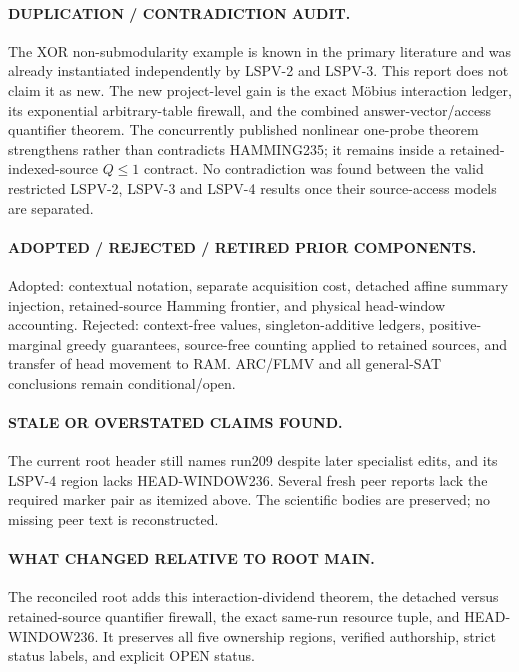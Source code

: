 \documentclass[11pt]{article}
\begin{document}
\paragraph{DUPLICATION / CONTRADICTION AUDIT.}
The XOR non-submodularity example is known in the primary literature and was
already instantiated independently by LSPV-2 and LSPV-3.  This report does not
claim it as new.  The new project-level gain is the exact M\"obius interaction
ledger, its exponential arbitrary-table firewall, and the combined
answer-vector/access quantifier theorem.  The concurrently published nonlinear
one-probe theorem strengthens rather than contradicts HAMMING235; it remains
inside a retained-indexed-source $Q\le1$ contract.  No contradiction was found
between the valid restricted LSPV-2, LSPV-3 and LSPV-4 results once their
source-access models are separated.

\paragraph{ADOPTED / REJECTED / RETIRED PRIOR COMPONENTS.}
Adopted: contextual notation, separate acquisition cost, detached affine
summary injection, retained-source Hamming frontier, and physical head-window
accounting.  Rejected: context-free values, singleton-additive ledgers,
positive-marginal greedy guarantees, source-free counting applied to retained
sources, and transfer of head movement to RAM.  ARC/FLMV and all general-SAT
conclusions remain conditional/open.

\paragraph{STALE OR OVERSTATED CLAIMS FOUND.}
The current root header still names run209 despite later specialist edits, and
its LSPV-4 region lacks HEAD-WINDOW236.  Several fresh peer reports lack the
required marker pair as itemized above.  The scientific bodies are preserved;
no missing peer text is reconstructed.

\paragraph{WHAT CHANGED RELATIVE TO ROOT MAIN.}
The reconciled root adds this interaction-dividend theorem, the detached versus
retained-source quantifier firewall, the exact same-run resource tuple, and
HEAD-WINDOW236.  It preserves all five ownership regions, verified authorship,
strict status labels, and explicit OPEN status.
\end{document}
